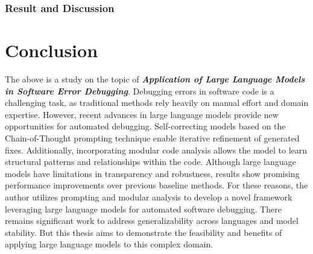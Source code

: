 \documentclass[a4paper,oneside]{book}
\begin{document}
\subsection{Result and Discussion}

\chapter{Conclusion}
The above is a study on the topic of \textbf{\textit{Application of Large Language Models in Software Error Debugging}}. Debugging errors in software code is a challenging task, as traditional methods rely heavily on manual effort and domain expertise. However, recent advances in large language models provide new opportunities for automated debugging. Self-correcting models based on the Chain-of-Thought prompting technique enable iterative refinement of generated fixes. Additionally, incorporating modular code analysis allows the model to learn structural patterns and relationships within the code. Although large language models have limitations in transparency and robustness, results show promising performance improvements over previous baseline methods. For these reasons, the author utilizes prompting and modular analysis to develop a novel framework leveraging large language models for automated software debugging. There remains significant work to address generalizability across languages and model stability. But this thesis aims to demonstrate the feasibility and benefits of applying large language models to this complex domain.

\newpage
\appendix
\end{document}
